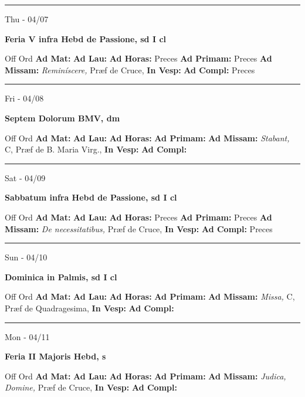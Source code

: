 \documentclass[letterpaper, 10pt]{article}
\begin{document}
\hrule
\begin{center}
Thu - 04/07
\end{center}\textbf{ \large Feria V infra Hebd de Passione, \textnormal{\normalsize sd I cl}}
\begin{justify}
Off Ord
\textbf{Ad Mat: }
\textbf{Ad Lau: }
\textbf{Ad Horas: }Preces
\textbf{Ad Primam: }Preces
\textbf{Ad Missam:} \textit{Reminíscere, } Præf de Cruce, 
\textbf{In Vesp: }
\textbf{Ad Compl: }Preces\end{justify}



\hrule
\begin{center}
Fri - 04/08
\end{center}\textbf{ \large Septem Dolorum BMV, \textnormal{\normalsize dm}}
\begin{justify}
Off Ord
\textbf{Ad Mat: }
\textbf{Ad Lau: }
\textbf{Ad Horas: }
\textbf{Ad Primam: }
\textbf{Ad Missam:} \textit{Stabant, } C, Præf de B. Maria Virg., 
\textbf{In Vesp: }
\textbf{Ad Compl: }\end{justify}



\hrule
\begin{center}
Sat - 04/09
\end{center}\textbf{ \large Sabbatum infra Hebd de Passione, \textnormal{\normalsize sd I cl}}
\begin{justify}
Off Ord
\textbf{Ad Mat: }
\textbf{Ad Lau: }
\textbf{Ad Horas: }Preces
\textbf{Ad Primam: }Preces
\textbf{Ad Missam:} \textit{De necessitatibus, } Præf de Cruce, 
\textbf{In Vesp: }
\textbf{Ad Compl: }Preces\end{justify}



\hrule
\begin{center}
Sun - 04/10
\end{center}\textbf{ \large Dominica in Palmis, \textnormal{\normalsize sd I cl}}
\begin{justify}
Off Ord
\textbf{Ad Mat: }
\textbf{Ad Lau: }
\textbf{Ad Horas: }
\textbf{Ad Primam: }
\textbf{Ad Missam:} \textit{Missa, } C, Præf de Quadragesima, 
\textbf{In Vesp: }
\textbf{Ad Compl: }\end{justify}



\hrule
\begin{center}
Mon - 04/11
\end{center}\textbf{ \large Feria II Majoris Hebd, \textnormal{\normalsize s}}
\begin{justify}
Off Ord
\textbf{Ad Mat: }
\textbf{Ad Lau: }
\textbf{Ad Horas: }
\textbf{Ad Primam: }
\textbf{Ad Missam:} \textit{Judica, Domine, } Præf de Cruce, 
\textbf{In Vesp: }
\textbf{Ad Compl: }\end{justify}
\end{document}
